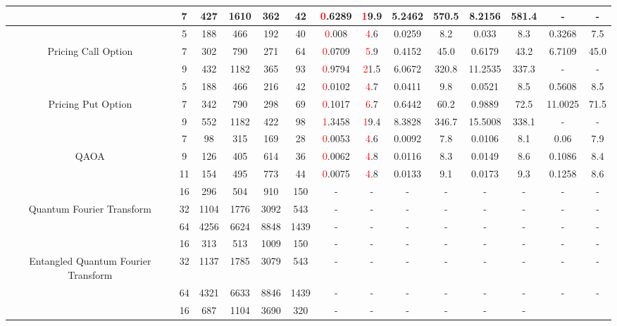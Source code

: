 \begin{table}[htb]
{\begin{tabular}{|c|c|c|c|c|c|c|c|c|c|c|c|c|c|}
 \\
 & 
7 & 427 & 1610 & 362 & 42
 & \textcolor{red}0.6289 & \textcolor{red}19.9
 & 5.2462 & 570.5
 & 8.2156 & 581.4
 & - & -
 \\
\hline
 & 
5 & 188 & 466 & 192 & 40
 & \textcolor{red}0.008 & \textcolor{red}4.6
 & 0.0259 & 8.2
 & 0.033 & 8.3
 & 0.3268 & 7.5
 \\
Pricing Call Option & 
7 & 302 & 790 & 271 & 64
 & \textcolor{red}0.0709 & \textcolor{red}5.9
 & 0.4152 & 45.0
 & 0.6179 & 43.2
 & 6.7109 & 45.0
 \\
 & 
9 & 432 & 1182 & 365 & 93
 & \textcolor{red}0.9794 & \textcolor{red}21.5
 & 6.0672 & 320.8
 & 11.2535 & 337.3
 & - & -
 \\
\hline
 & 
5 & 188 & 466 & 216 & 42
 & \textcolor{red}0.0102 & \textcolor{red}4.7
 & 0.0411 & 9.8
 & 0.0521 & 8.5
 & 0.5608 & 8.5
 \\
Pricing Put Option & 
7 & 342 & 790 & 298 & 69
 & \textcolor{red}0.1017 & \textcolor{red}6.7
 & 0.6442 & 60.2
 & 0.9889 & 72.5
 & 11.0025 & 71.5
 \\
 & 
9 & 552 & 1182 & 422 & 98
 & \textcolor{red}1.3458 & \textcolor{red}19.4
 & 8.3828 & 346.7
 & 15.5008 & 338.1
 & - & -
 \\
\hline
 & 
7 & 98 & 315 & 169 & 28
 & \textcolor{red}0.0053 & \textcolor{red}4.6
 & 0.0092 & 7.8
 & 0.0106 & 8.1
 & 0.06 & 7.9
 \\
QAOA & 
9 & 126 & 405 & 614 & 36
 & \textcolor{red}0.0062 & \textcolor{red}4.8
 & 0.0116 & 8.3
 & 0.0149 & 8.6
 & 0.1086 & 8.4
 \\
 & 
11 & 154 & 495 & 773 & 44
 & \textcolor{red}0.0075 & \textcolor{red}4.8
 & 0.0133 & 9.1
 & 0.0173 & 9.3
 & 0.1258 & 8.6
 \\
\hline
 & 
16 & 296 & 504 & 910 & 150
 & - & -
 & - & -
 & - & -
 & - & -
 \\
Quantum Fourier Transform & 
32 & 1104 & 1776 & 3092 & 543
 & - & -
 & - & -
 & - & -
 & - & -
 \\
 & 
64 & 4256 & 6624 & 8848 & 1439
 & - & -
 & - & -
 & - & -
 & - & -
 \\
\hline
 & 
16 & 313 & 513 & 1009 & 150
 & - & -
 & - & -
 & - & -
 & - & -
 \\
Entangled Quantum Fourier Transform & 
32 & 1137 & 1785 & 3079 & 543
 & - & -
 & - & -
 & - & -
 & - & -
 \\
 & 
64 & 4321 & 6633 & 8846 & 1439
 & - & -
 & - & -
 & - & -
 & - & -
 \\
\hline
 & 
16 & 687 & 1104 & 3690 & 320
 & - & -
 & - & -
 & - & -

\end{tabular}}
\end{table}

